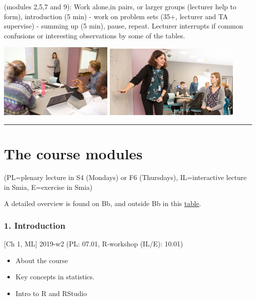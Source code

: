 \documentclass[]{article}
\providecommand{\tightlist}{%
  \setlength{\itemsep}{0pt}\setlength{\parskip}{0pt}}
\begin{document}
(modules 2,5,7 and 9): Work alone,in pairs, or larger groups (lecturer
help to form), introduction (5 min) - work on problem sets (35+,
lecturer and TA supervise) - summing up (5 min), pause, repeat. Lecturer
interrupts if common confusions or interesting observations by some of
the tables.

\includegraphics[width=2.1875in,height=\textheight]{../img/smia-6241.jpg}
\includegraphics[width=2.60417in,height=\textheight]{../img/mette-maria-banner-forside.jpg}

\begin{center}\rule{0.5\linewidth}{\linethickness}\end{center}

\hypertarget{the-course-modules}{%
\section{The course modules}\label{the-course-modules}}

(PL=plenary lecture in S4 (Mondays) or F6 (Thursdays), IL=interactive
lecture in Smia, E=exercise in Smia)

A detailed overview is found on Bb, and outside Bb in this
\href{https://www.math.ntnu.no/emner/TMA4268/2019v/table2019.html}{table}.

\hypertarget{introduction-1}{%
\subsubsection{1. Introduction}\label{introduction-1}}

{[}Ch 1, ML{]} 2019-w2 (PL: 07.01, R-workshop (IL/E): 10.01)

\begin{itemize}
\tightlist
\item
  About the course
\item
  Key concepts in statistics.
\item
  Intro to R and RStudio
\end{itemize}
\end{document}

